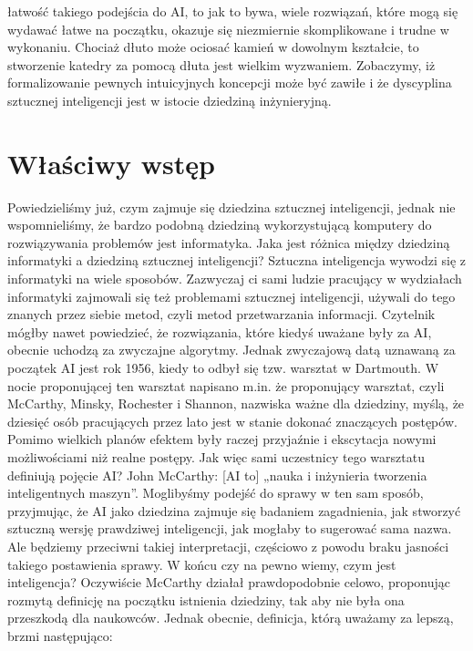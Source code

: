 łatwość takiego podejścia do AI, to jak to bywa, wiele rozwiązań, które mogą się wydawać łatwe na początku, okazuje się niezmiernie skomplikowane i trudne w wykonaniu. Chociaż dłuto może ociosać kamień w dowolnym kształcie, to stworzenie katedry za pomocą dłuta jest wielkim wyzwaniem. Zobaczymy, iż formalizowanie pewnych intuicyjnych koncepcji może być zawiłe i że dyscyplina sztucznej inteligencji jest w istocie dziedziną inżynieryjną.

\section{Właściwy wstęp}

Powiedzieliśmy już, czym zajmuje się dziedzina sztucznej inteligencji, jednak nie wspomnieliśmy, że bardzo podobną dziedziną wykorzystującą komputery do rozwiązywania problemów jest informatyka. Jaka jest różnica między dziedziną informatyki a dziedziną sztucznej inteligencji? Sztuczna inteligencja wywodzi się z informatyki na wiele sposobów. Zazwyczaj ci sami ludzie pracujący w wydziałach informatyki zajmowali się też problemami sztucznej inteligencji, używali do tego znanych przez siebie metod, czyli metod przetwarzania informacji. Czytelnik mógłby nawet powiedzieć, że rozwiązania, które kiedyś uważane były za AI, obecnie uchodzą za zwyczajne algorytmy. Jednak zwyczajową datą uznawaną za początek AI jest rok 1956, kiedy to odbył się tzw. warsztat w Dartmouth. W nocie proponującej ten warsztat napisano m.in. że proponujący warsztat, czyli McCarthy, Minsky, Rochester i Shannon, nazwiska ważne dla dziedziny, myślą, że dziesięć osób pracujących przez lato jest w stanie dokonać znaczących postępów. Pomimo wielkich planów efektem były raczej przyjaźnie i ekscytacja nowymi możliwościami niż realne postępy. Jak więc sami uczestnicy tego warsztatu definiują pojęcie AI? John McCarthy: [AI to] „nauka i inżynieria tworzenia inteligentnych maszyn”. Moglibyśmy podejść do sprawy w ten sam sposób, przyjmując, że AI jako dziedzina zajmuje się badaniem zagadnienia, jak stworzyć sztuczną wersję prawdziwej inteligencji, jak mogłaby to sugerować sama nazwa. Ale będziemy przeciwni takiej interpretacji, częściowo z powodu braku jasności takiego postawienia sprawy. W końcu czy na pewno wiemy, czym jest inteligencja? Oczywiście McCarthy działał prawdopodobnie celowo, proponując rozmytą definicję na początku istnienia dziedziny, tak aby nie była ona przeszkodą dla naukowców. Jednak obecnie, definicja, którą uważamy za lepszą, brzmi następująco:\newline


